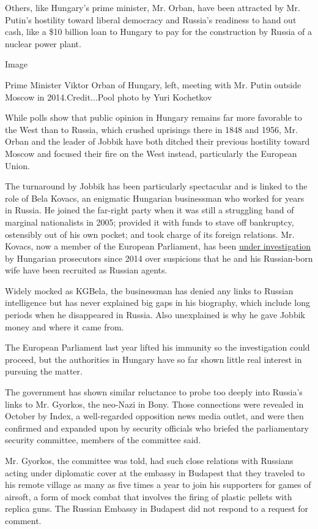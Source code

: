 Others, like Hungary's prime minister, Mr. Orban, have been attracted by
Mr. Putin's hostility toward liberal democracy and Russia's readiness to
hand out cash, like a \$10 billion loan to Hungary to pay for the
construction by Russia of a nuclear power plant.

Image

Prime Minister Viktor Orban of Hungary, left, meeting with Mr. Putin
outside Moscow in 2014.Credit...Pool photo by Yuri Kochetkov

While polls show that public opinion in Hungary remains far more
favorable to the West than to Russia, which crushed uprisings there in
1848 and 1956, Mr. Orban and the leader of Jobbik have both ditched
their previous hostility toward Moscow and focused their fire on the
West instead, particularly the European Union.

The turnaround by Jobbik has been particularly spectacular and is linked
to the role of Bela Kovacs, an enigmatic Hungarian businessman who
worked for years in Russia. He joined the far-right party when it was
still a struggling band of marginal nationalists in 2005; provided it
with funds to stave off bankruptcy, ostensibly out of his own pocket;
and took charge of its foreign relations. Mr. Kovacs, now a member of
the European Parliament, has been
\href{http://www.nytimes.com/2015/10/15/world/europe/hungary-european-parliament-lifts-immunity-for-spy-suspect.html}{under
investigation} by Hungarian prosecutors since 2014 over suspicions that
he and his Russian-born wife have been recruited as Russian agents.

Widely mocked as KGBela, the businessman has denied any links to Russian
intelligence but has never explained big gaps in his biography, which
include long periods when he disappeared in Russia. Also unexplained is
why he gave Jobbik money and where it came from.

The European Parliament last year lifted his immunity so the
investigation could proceed, but the authorities in Hungary have so far
shown little real interest in pursuing the matter.

The government has shown similar reluctance to probe too deeply into
Russia's links to Mr. Gyorkos, the neo-Nazi in Bony. Those connections
were revealed in October by Index, a well-regarded opposition news media
outlet, and were then confirmed and expanded upon by security officials
who briefed the parliamentary security committee, members of the
committee said.

Mr. Gyorkos, the committee was told, had such close relations with
Russians acting under diplomatic cover at the embassy in Budapest that
they traveled to his remote village as many as five times a year to join
his supporters for games of airsoft, a form of mock combat that involves
the firing of plastic pellets with replica guns. The Russian Embassy in
Budapest did not respond to a request for comment.


